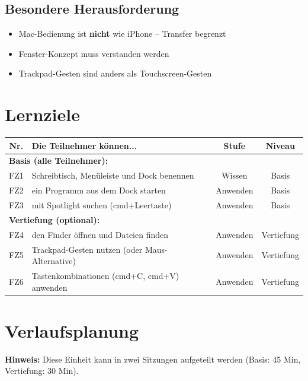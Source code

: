 \documentclass[11pt,a4paper]{article}
\begin{document}
\subsection{Besondere Herausforderung}
\begin{itemize}
    \item Mac-Bedienung ist \textbf{nicht} wie iPhone -- Transfer begrenzt
    \item Fenster-Konzept muss verstanden werden
    \item Trackpad-Gesten sind anders als Touchscreen-Gesten
\end{itemize}

\section{Lernziele}

\begin{tabular}{|c|p{7cm}|c|c|}
\hline
\textbf{Nr.} & \textbf{Die Teilnehmer können...} & \textbf{Stufe} & \textbf{Niveau} \\
\hline
\multicolumn{4}{|l|}{\textbf{Basis (alle Teilnehmer):}} \\
\hline
FZ1 & Schreibtisch, Menüleiste und Dock benennen & Wissen & Basis \\
FZ2 & ein Programm aus dem Dock starten & Anwenden & Basis \\
FZ3 & mit Spotlight suchen (cmd+Leertaste) & Anwenden & Basis \\
\hline
\multicolumn{4}{|l|}{\textbf{Vertiefung (optional):}} \\
\hline
FZ4 & den Finder öffnen und Dateien finden & Anwenden & Vertiefung \\
FZ5 & Trackpad-Gesten nutzen (oder Maus-Alternative) & Anwenden & Vertiefung \\
FZ6 & Tastenkombinationen (cmd+C, cmd+V) anwenden & Anwenden & Vertiefung \\
\hline
\end{tabular}

\section{Verlaufsplanung}

\textbf{Hinweis:} Diese Einheit kann in zwei Sitzungen aufgeteilt werden (Basis: 45 Min, Vertiefung: 30 Min).
\end{document}
